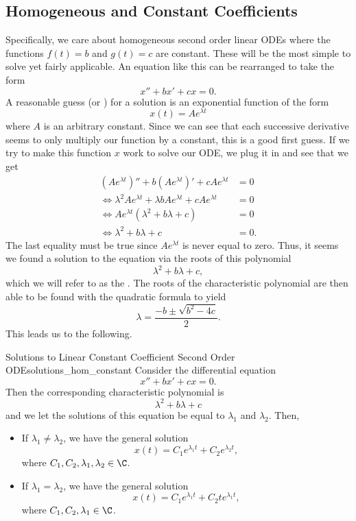         \subsection{Homogeneous and Constant Coefficients}
        Specifically, we care about homogeneous second order linear ODEs where the functions $f(t)=b$ and $g(t)=c$ are constant.  These will be the most simple to solve yet fairly applicable. An equation like this can be rearranged to take the form
        \[
        x''+bx'+cx=0.
        \]
        A reasonable guess (or ) for a solution is an exponential function of the form
        \[
        x(t)=Ae^{\lambda t}
        \]
        where $A$ is an arbitrary constant. Since we can see that each successive derivative seems to only multiply our function by a constant, this is a good first guess. If we try to make this function $x$ work to solve our ODE, we plug it in and see that we get
        \begin{align*}
            \left(Ae^{\lambda t}\right)''+b\left(Ae^{\lambda t}\right)'+cAe^{\lambda t}&=0\\
            \iff\lambda^2 Ae^{\lambda t}+\lambda b Ae^{\lambda t} +c Ae^{\lambda t}&=0\\
            \iff Ae^{\lambda t}\left( \lambda^2 + b\lambda +c\right)&=0\\
            \iff \lambda^2 +b\lambda +c &=0.
        \end{align*}
        The last equality must be true since $Ae^{\lambda t}$ is never equal to zero.  Thus, it seems we found a solution to the equation via the roots of this polynomial
        \[
        \lambda^2+b\lambda +c,
        \]
        which we will refer to as the . The roots of the characteristic polynomial are then able to be found with the quadratic formula to yield
        \[
        \lambda=\frac{-b\pm \sqrt{b^2-4c}}{2}.
        \]
        This leads us to the following.

        \begin{prop}{Solutions to Linear Constant Coefficient Second Order ODE}{solutions_hom_constant}
        Consider the differential equation
        \[
        x''+bx'+cx=0.
        \]
        Then the corresponding characteristic polynomial is
        \[
        \lambda^2+b\lambda +c
        \]
        and we let the solutions of this equation be equal to $\lambda_1$ and $\lambda_2$. Then,
        \begin{itemize}
                \item If $\lambda_1 \neq \lambda_2$, we have the general solution
        \[
        x(t)=C_1 e^{\lambda_1t}+C_2e^{\lambda_2t},
        \]
        where $C_1,C_2,\lambda_1,\lambda_2 \in \C$.
            \item If $\lambda_1=\lambda_2$, we have the general solution
        \[
            x(t) = C_1 e^{\lambda_1 t} + C_2 t e^{\lambda_1 t},
        \]
        where $C_1, C_2, \lambda_1 \in \C$.
        \end{itemize}
        \end{prop}

